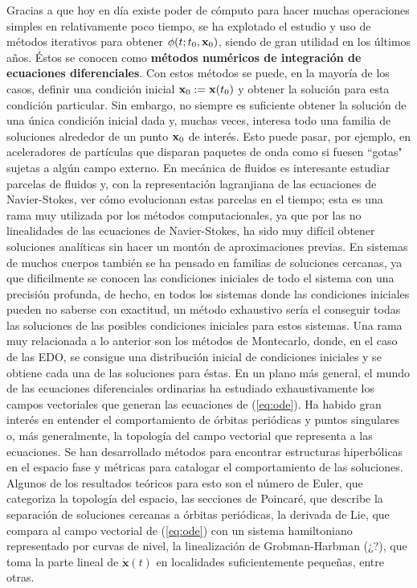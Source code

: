 Gracias a que hoy en día existe poder de cómputo para hacer muchas operaciones simples en relativamente poco tiempo, se ha explotado el estudio y uso de métodos iterativos para obtener $\phi(t;t_0,\mathbf{x}_0)$, siendo de gran utilidad en los últimos años. Éstos se conocen como \textbf{métodos numéricos de integración de ecuaciones diferenciales}. Con estos métodos se puede, en la mayoría de los casos, definir una condición inicial $\mathbf{x}_0 := \mathbf{x}(t_0)$ y obtener la solución para esta condición particular. Sin embargo, no siempre es suficiente obtener la solución de una única condición inicial dada y, muchas veces, interesa todo una familia de soluciones alrededor de un punto $\mathbf{x}_0$ de interés. Esto puede pasar, por ejemplo, en aceleradores de partículas que disparan paquetes de onda como si fuesen ``gotas" sujetas a algún campo externo. En mecánica de fluidos es interesante estudiar parcelas de fluidos y, con la representación lagranjiana de las ecuaciones de Navier-Stokes, ver cómo evolucionan estas parcelas en el tiempo; esta es una rama muy utilizada por los métodos computacionales, ya que por las no linealidades de las ecuaciones de Navier-Stokes, ha sido muy difícil obtener soluciones analíticas sin hacer un montón de aproximaciones previas. En sistemas de muchos cuerpos también se ha pensado en familias de soluciones cercanas, ya que dificilmente se conocen las condiciones iniciales de todo el sistema con una precisión profunda, de hecho, en todos los sistemas donde las condiciones iniciales pueden no saberse con exactitud, un método exhaustivo sería el conseguir todas las soluciones de las posibles condiciones iniciales para estos sistemas. Una rama muy relacionada a lo anterior son los métodos de Montecarlo, donde, en el caso de las EDO, se consigue una distribución inicial de condiciones iniciales y se obtiene cada una de las soluciones para éstas. 
En un plano más general, el mundo de las ecuaciones diferenciales ordinarias ha estudiado exhaustivamente los campos vectoriales que generan las ecuaciones de (\ref{eq:ode}). Ha habido gran interés en entender el comportamiento de órbitas periódicas y puntos singulares o, más generalmente, la topología del campo vectorial que representa a las ecuaciones. Se han desarrollado métodos para encontrar estructuras hiperbólicas en el espacio fase y métricas para catalogar el comportamiento de las soluciones. Algunos de los resultados teóricos para esto son el número de Euler, que categoriza la topología del espacio, las secciones de Poincaré, que describe la separación de soluciones cercanas a órbitas periódicas, la derivada de Lie, que compara al campo vectorial de (\ref{eq:ode}) con un sistema hamiltoniano representado por curvas de nivel, la linealización de Grobman-Harbman (¿?), que toma la parte lineal de $\dot{\mathbf{x}}(t)$ en localidades suficientemente pequeñas, entre otras. 

